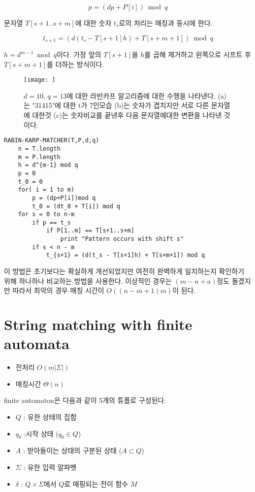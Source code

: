 $$p = (dp+P[i]) \bmod q$$

문자열 $T[s+1..s+m]$에 대한 숫자 $t_s$로의 처리는 매칭과 동시에 한다.

$$t_{s+1} = (d(t_s - T[s+1]h) + T[s+m+1]) \bmod q$$

$ h = d^{m-1} \bmod q$이다. 가장 앞의 $T[s+1]$을 $h$를 곱해 제거하고 왼쪽으로 시프트 후 $T[s+m+1]$를 더하는 방식이다.


\begin{figure}[h!]
    \centering
    \texttt{[image: ]}
    \caption{$d = 10$, $q = 13$에 대한 라빈카프 알고리즘에 대한 수행을 나타낸다. (a)는 "31415"에 대한 t가 7인모습 (b)는 숫자가 겹치지만 서로 다른 문자열에 대한것 (c)는 숫자비교를 끝낸후 다음 문자열에대한 변환을 나타낸 것이다.}
\end{figure}


\begin{lstlisting}[syle = CStyle]
RABIN-KARP-MATCHER(T,P,d,q)
    n = T.length
    m = P.length
    h = d^{m-1} mod q
    p = 0
    t_0 = 0
    for( i = 1 to m)
        p = (dp+P[i])mod q
        t_0 = (dt_0 + T[i]) mod q
    for s = 0 to n-m
        if p == t_s
            if P[1..m] == T[s+1..s+m]
                print "Pattern occurs with shift s"
        if s < n - m
            t_{s+1} = (d(t_s - T[s+1]h) + T[s+m+1]) mod q
\end{lstlisting}

이 방법은 초기보다는 확실하게 개선되었지만 여전히 완벽하게 일치하는지 확인하기 위해 하나하나 비교하는 방법을 사용한다. 이상적인 경우는 $(m-n+a)$정도 돌겠지만  따라서 최악의 경우 매칭 시간이 $O((n-m+1)m)$이 된다.

\section{String matching with finite automata}

\begin{itemize}
    \item 전처리 $O(m|\Sigma|)$
    \item 매칭시간 $\Theta(n)$
\end{itemize}

\begin{dfn}[automata]
    finite automaton은 다음과 같이 5개의 튜플로 구성된다.
    \begin{itemize}
        \item $Q$ : 유한 상태의 집합
        \item $q_0$ :시작 상태 ($q_0 \in Q$)
        \item $A$ : 받아들이는 상태의 구분된 상태 ($A \subset Q$)
        \item $\Sigma$ : 유한 입력 알파벳
        \item $\delta$ : $Q \times \Sigma$에서 $Q$로 매핑되는 전이 함수 $M$    \end{itemize}
\end{dfn}

